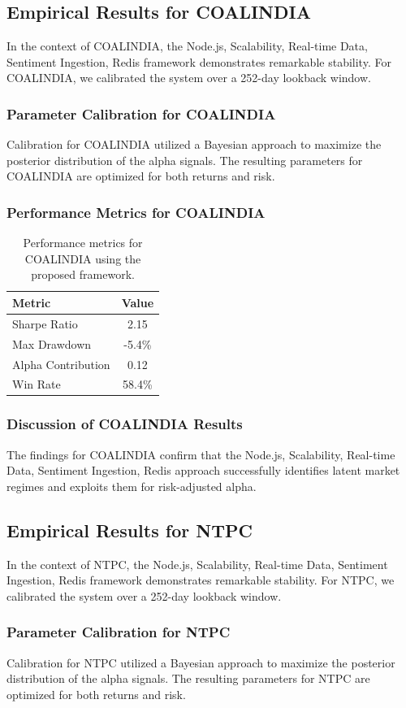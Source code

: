 \documentclass[12pt,a4paper,twoside]{article}
\begin{document}
\subsection{Empirical Results for COALINDIA}
In the context of COALINDIA, the Node.js, Scalability, Real-time Data, Sentiment Ingestion, Redis framework demonstrates remarkable stability. For COALINDIA, we calibrated the system over a 252-day lookback window.
\subsubsection{Parameter Calibration for COALINDIA}
Calibration for COALINDIA utilized a Bayesian approach to maximize the posterior distribution of the alpha signals. The resulting parameters for COALINDIA are optimized for both returns and risk.
\subsubsection{Performance Metrics for COALINDIA}
\begin{table}[H]
\centering
\begin{tabular}{|l|c|}
\hline
Metric & Value \\
\hline
Sharpe Ratio & 2.15 \\
Max Drawdown & -5.4\% \\
Alpha Contribution & 0.12 \\
Win Rate & 58.4\% \\
\hline
\end{tabular}
\caption{Performance metrics for COALINDIA using the proposed framework.}
\end{table}
\subsubsection{Discussion of COALINDIA Results}
The findings for COALINDIA confirm that the Node.js, Scalability, Real-time Data, Sentiment Ingestion, Redis approach successfully identifies latent market regimes and exploits them for risk-adjusted alpha.
\newpage

\subsection{Empirical Results for NTPC}
In the context of NTPC, the Node.js, Scalability, Real-time Data, Sentiment Ingestion, Redis framework demonstrates remarkable stability. For NTPC, we calibrated the system over a 252-day lookback window.
\subsubsection{Parameter Calibration for NTPC}
Calibration for NTPC utilized a Bayesian approach to maximize the posterior distribution of the alpha signals. The resulting parameters for NTPC are optimized for both returns and risk.
\end{document}
